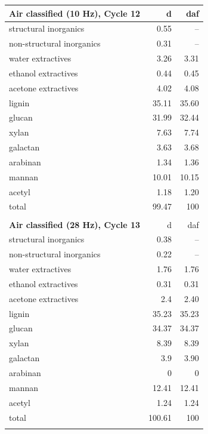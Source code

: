 \documentclass[12pt,titlepage]{article}
\begin{document}
\begin{longtable}{lrr}
    \textbf{Air classified (10 Hz), Cycle 12} & d & daf \\
    \midrule
    structural inorganics     & 0.55  & -- \\
    non-structural inorganics & 0.31  & -- \\
    water extractives         & 3.26  & 3.31 \\
    ethanol extractives       & 0.44  & 0.45 \\
    acetone extractives       & 4.02  & 4.08 \\
    lignin                    & 35.11 & 35.60 \\
    glucan                    & 31.99 & 32.44 \\
    xylan                     & 7.63  & 7.74 \\
    galactan                  & 3.63  & 3.68 \\
    arabinan                  & 1.34  & 1.36 \\
    mannan                    & 10.01 & 10.15 \\
    acetyl                    & 1.18  & 1.20 \\
    total                     & 99.47 & 100 \\
    \\

    \textbf{Air classified (28 Hz), Cycle 13} & d & daf \\
    \midrule
    structural inorganics     & 0.38   & -- \\
    non-structural inorganics & 0.22   & -- \\
    water extractives         & 1.76   & 1.76 \\
    ethanol extractives       & 0.31   & 0.31 \\
    acetone extractives       & 2.4    & 2.40 \\
    lignin                    & 35.23  & 35.23 \\
    glucan                    & 34.37  & 34.37 \\
    xylan                     & 8.39   & 8.39 \\
    galactan                  & 3.9    & 3.90 \\
    arabinan                  & 0      & 0 \\
    mannan                    & 12.41  & 12.41 \\
    acetyl                    & 1.24   & 1.24 \\
    total                     & 100.61 & 100 \\
    \\


\end{longtable}
\end{document}
